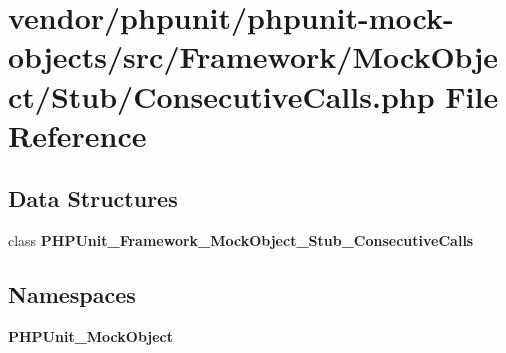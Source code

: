 \section{vendor/phpunit/phpunit-\/mock-\/objects/src/\+Framework/\+Mock\+Object/\+Stub/\+Consecutive\+Calls.php File Reference}
\label{_consecutive_calls_8php}
\subsection*{Data Structures}
\begin{DoxyCompactItemize}
\item 
class {\bf P\+H\+P\+Unit\+\_\+\+Framework\+\_\+\+Mock\+Object\+\_\+\+Stub\+\_\+\+Consecutive\+Calls}
\end{DoxyCompactItemize}
\subsection*{Namespaces}
\begin{DoxyCompactItemize}
\item 
 {\bf P\+H\+P\+Unit\+\_\+\+Mock\+Object}
\end{DoxyCompactItemize}
